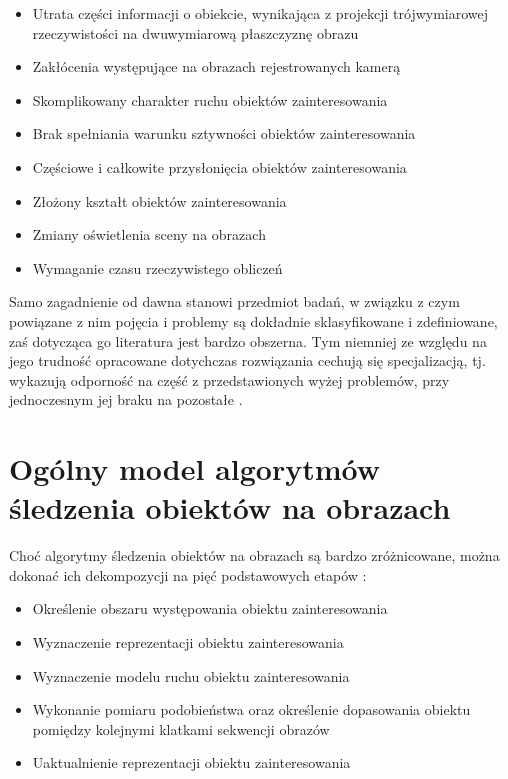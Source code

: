 \begin{itemize}

	\item Utrata części informacji o obiekcie, wynikająca z projekcji trójwymiarowej rzeczywistości na dwuwymiarową płaszczyznę obrazu
	\item Zakłócenia występujące na obrazach rejestrowanych kamerą
	\item Skomplikowany charakter ruchu obiektów zainteresowania
	\item Brak spełniania warunku sztywności obiektów zainteresowania
	\item Częściowe i całkowite przysłonięcia obiektów zainteresowania
	\item Złożony kształt obiektów  zainteresowania
	\item Zmiany oświetlenia sceny na obrazach
	\item Wymaganie czasu rzeczywistego obliczeń

\end{itemize}  

Samo zagadnienie od dawna stanowi przedmiot badań, w związku z czym powiązane z nim pojęcia i problemy są dokładnie sklasyfikowane i zdefiniowane, zaś dotycząca go literatura jest bardzo obszerna. Tym niemniej ze względu na jego trudność opracowane dotychczas rozwiązania cechują się specjalizacją, tj. wykazują odporność na część z przedstawionych wyżej problemów, przy jednoczesnym jej braku na pozostałe \cite{Smeulders2010}.

\section{Ogólny model algorytmów śledzenia obiektów na obrazach}
\label{sec:Ogolny_model_algorytmow_sledzenia_obiektow_na_obrazach}

Choć algorytmy śledzenia obiektów na obrazach są bardzo zróżnicowane, można dokonać ich dekompozycji na pięć podstawowych etapów \cite{Smeulders2010}:

\begin{itemize}
	\item Określenie obszaru występowania obiektu zainteresowania
	\item Wyznaczenie reprezentacji obiektu zainteresowania
	\item Wyznaczenie modelu ruchu obiektu zainteresowania
	\item Wykonanie pomiaru podobieństwa oraz określenie dopasowania obiektu pomiędzy kolejnymi klatkami sekwencji obrazów
	\item Uaktualnienie reprezentacji obiektu zainteresowania
\end{itemize}
 

